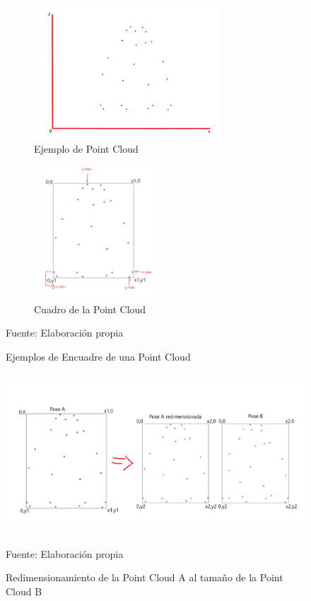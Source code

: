 \begin{figure}[t!]
	\centering
	\begin{subfigure}{.5\textwidth}
		\centering
		\includegraphics[width=7cm,height=5cm,]{./Images/pointcloud.png}
		\caption{Ejemplo de Point Cloud}
		\label{pointcloud}
	\end{subfigure}%
	\begin{subfigure}{.5\textwidth}
		\centering
		\includegraphics[width=5cm,height=5cm]{./Images/cuadropointcloud1.png}
		\caption{Cuadro de la Point Cloud}
		\label{cuadro}
	\end{subfigure}
	\caption{Ejemplos de Encuadre de una Point Cloud}
	\footnotesize Fuente: Elaboración propia
	\label{pointcloudtocuadro}
\end{figure}


\begin{figure}[t!]
	\centering
	\includegraphics[width=14cm,height=6cm,]{./Images/redimensioncuadro.png}
	\caption{Redimensionamiento de la Point Cloud A al tamaño de la Point Cloud B}
	\footnotesize Fuente: Elaboración propia
	\label{redimensioncuadro}
\end{figure}

